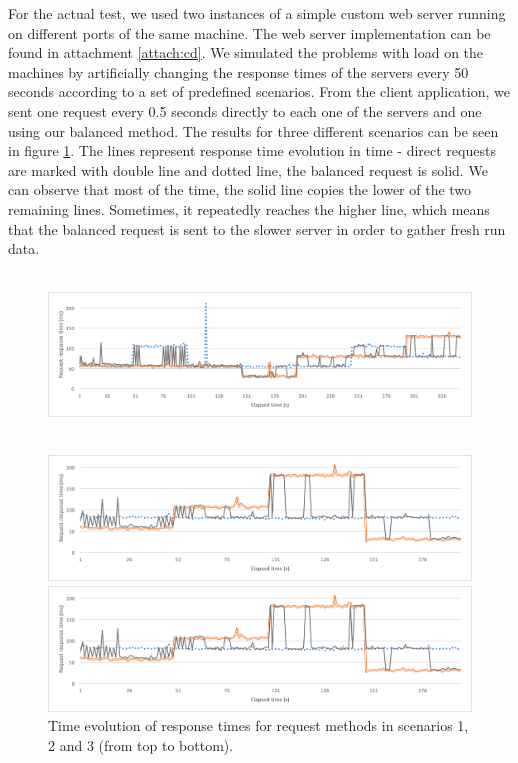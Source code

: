 For the actual test, we used two instances of a simple custom web server running on different ports of the same machine. The web server implementation can be found in attachment \ref{attach:cd}. We simulated the problems with load on the machines by artificially changing the response times of the servers every 50 seconds according to a set of predefined scenarios. From the client application, we sent one request every 0.5 seconds directly to each one of the servers and one using our balanced method. The results for three different scenarios can be seen in figure \ref{fig:load_balance_scen}. The lines represent response time evolution in time - direct requests are marked with double line and dotted line, the balanced request is solid. We can observe that most of the time, the solid line copies the lower of the two remaining lines. Sometimes, it repeatedly reaches the higher line, which means that the balanced request is sent to the slower server in order to gather fresh run data.

\begin{figure}[h!]
	\captionsetup{justification=centering,margin=0.5cm}
	\centerline{
		\mbox{
			\includegraphics[width=130mm]{./img/load_balance_scen1.png}
		}
	}
	\centerline{
		\mbox{\includegraphics[width=130mm]{./img/load_balance_scen2.png}}
	}
	\centerline{
		\mbox{\includegraphics[width=130mm]{./img/load_balance_scen3.png}}
	}
	\caption{Time evolution of response times for request methods in scenarios 1, 2 and 3 (from top to bottom).}
	\label{fig:load_balance_scen}
\end{figure}


